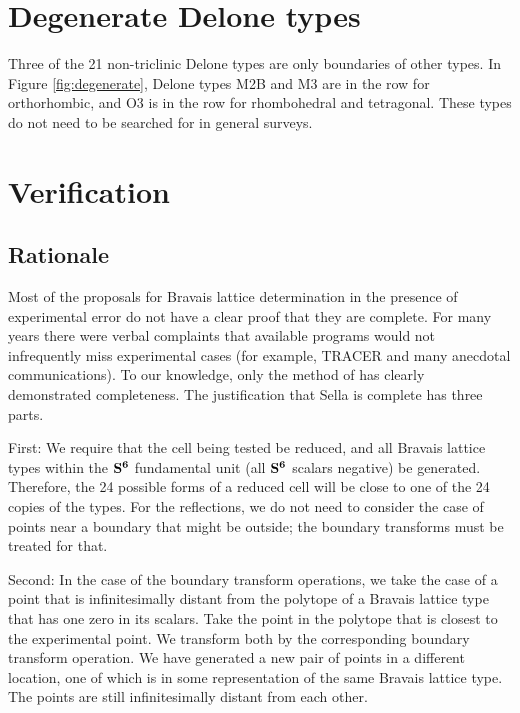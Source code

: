 \documentclass[preprint]{iucr}              %
\newcommand{\SVI}[0]{$\bf{S^{6}}$}
\begin{document}
\section{Degenerate Delone types}

Three of the 21 non-triclinic Delone types are only boundaries of other types. In Figure 
\ref{fig:degenerate}, Delone types M2B and M3 are in the row for orthorhombic, and
O3 is in the row for rhombohedral and tetragonal. These types do not need to
be searched for in general surveys.

\section{Verification}

\subsection{Rationale}

Most of the proposals for Bravais lattice determination in the 
presence of experimental error do not have a clear proof that 
they are complete. For many years there were verbal complaints 
that available programs would not infrequently miss experimental 
cases (for example, TRACER \cite{lawton1965} and many anecdotal 
communications).  To our knowledge, only the method of 
\cite{tomiyasu2012} has clearly demonstrated completeness. 
The justification that Sella is complete has three parts.

First: We require that the cell being tested be reduced, and
all Bravais lattice types within the \SVI{} fundamental unit (all
\SVI{} scalars negative) be generated. Therefore,
 the 24 possible forms of a 
reduced cell will be close to one of the 24 copies of the types. 
For the reflections, we do not need to consider the case of 
points near a boundary that might be outside; the boundary 
transforms must be treated for that.

Second: In the case of the boundary transform operations, we take the case of a point that is infinitesimally distant from the polytope of a 
Bravais lattice type that has one zero in its scalars. Take 
the point in the polytope that is closest to the experimental 
point. We transform both by the corresponding boundary transform 
operation. We have generated a new pair of points in a 
different location, one of which is in some representation of 
the same Bravais lattice type. The points are still 
infinitesimally distant from each other.
\end{document}
